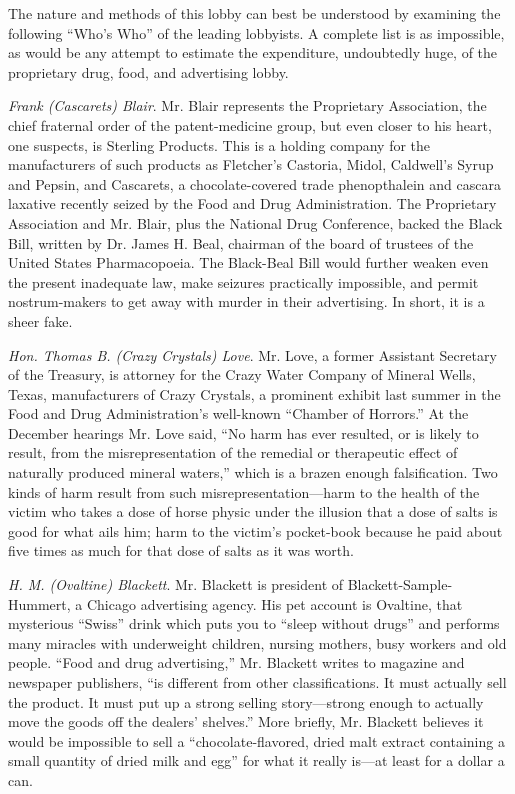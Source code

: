 \documentclass[twoside,nohyper,openany,nobib]{tufte-book}
\begin{document}
The nature and methods of this lobby can best be understood by examining
the following ``Who's Who'' of the leading lobbyists. A complete list is
as impossible, as would be any attempt to estimate the expenditure,
undoubtedly huge, of the proprietary drug, food, and advertising lobby.

\emph{Frank (Cascarets) Blair}. Mr. Blair represents the Proprietary
Association, the chief fraternal order of the patent-medicine group, but
even closer to his heart, one suspects, is Sterling Products. This is a
holding company for the manufacturers of such products as Fletcher's
Castoria, Midol, Caldwell's Syrup and Pepsin, and Cascarets, a
chocolate-covered trade phenopthalein and cascara laxative recently
seized by the Food and Drug Administration. The Proprietary Association
and Mr. Blair, plus the National Drug Conference, backed the Black Bill,
written by Dr. James H. Beal, chairman of the board of trustees of the
United States Pharmacopoeia. The Black-Beal Bill would further weaken
even the present inadequate law, make seizures practically impossible,
and permit nostrum-makers to get away with murder in their advertising.
In short, it is a sheer fake.

\emph{Hon. Thomas B. (Crazy Crystals) Love}. Mr. Love, a former
Assistant Secretary of the Treasury, is attorney for the Crazy Water
Company of Mineral Wells, Texas, manufacturers of Crazy Crystals, a
prominent exhibit last summer in the Food and Drug Administration's
well-known ``Chamber of Horrors.'' At the December hearings Mr. Love
said, ``No harm has ever resulted, or is likely to result, from the
misrepresentation of the remedial or therapeutic effect of naturally
produced mineral waters,'' which is a brazen enough falsification. Two
kinds of harm result from such misrepresentation---harm to the health of
the victim who takes a dose of horse physic under the illusion that a
dose of salts is good for what ails him; harm to the victim's
pocket-book because he paid about five times as much for that dose of
salts as it was worth.

\emph{H. M. (Ovaltine) Blackett}. Mr. Blackett is president of
Blackett-Sample-Hummert, a Chicago advertising agency. His pet account
is Ovaltine, that mysterious ``Swiss'' drink which puts you to ``sleep
without drugs'' and performs many miracles with underweight children,
nursing mothers, busy workers and old people. ``Food and drug
advertising,'' Mr. Blackett writes to magazine and newspaper publishers,
``is different from other classifications. It must actually sell the
product. It must put up a strong selling story---strong enough to
actually move the goods off the dealers' shelves.'' More briefly, Mr.
Blackett believes it would be impossible to sell a ``chocolate-flavored,
dried malt extract containing a small quantity of dried milk and egg''
for what it really is---at least for a dollar a can.
\end{document}
